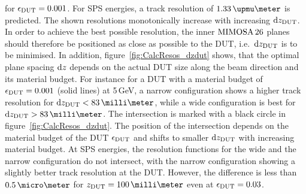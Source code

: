 \noindent
for $\mathnormal{\epsilon_{\textrm{DUT}}} = 0.001$.
For SPS energies, a track resolution of $1.33\,\upmu\meter$ is predicted.
The shown resolutions monotonically increase with increasing $\textrm{d}z_{\textrm{DUT}}$. 
In order to achieve the best possible resolution, the inner $\textrm{MIMOSA\,26}$ planes should therefore be positioned as close as possible to the DUT, i.e.~$\textrm{d}z_{\textrm{DUT}}$ is to be minimised. 
In addition, figure~\ref{fig:CalcResos_dzdut} shows, that the optimal plane spacing $\textrm{d}z$ depends on the actual DUT size along the beam direction and its material budget.
For instance for a DUT with a material budget of $\mathnormal{\epsilon_{\textrm{DUT}}} = 0.001$ (solid lines) at 5\,GeV, a narrow configuration shows a higher track resolution for $\dzdut < 83\,\milli\meter$,
 while a wide configuration is best for $\dzdut > 83\,\milli\meter$.
The intersection is marked with a black circle in figure~\ref{fig:CalcResos_dzdut}. 
The position of the intersection depends on the material budget of the DUT $\mathnormal{\epsilon_{\textrm{DUT}}}$ and shifts to smaller $\textrm{d}z_{\textrm{DUT}}$ with increasing material budget. 
At SPS energies, the resolution functions for the wide and the narrow configuration do not intersect, with the narrow configuration showing a slightly better track resolution at the DUT. 
However, the difference is less than $0.5\,\micro\meter$ for $\zdut = 100\,\milli\meter$ even at $\mathnormal{\epsilon_{\textrm{DUT}}} = 0.03$. 



% 
% 

